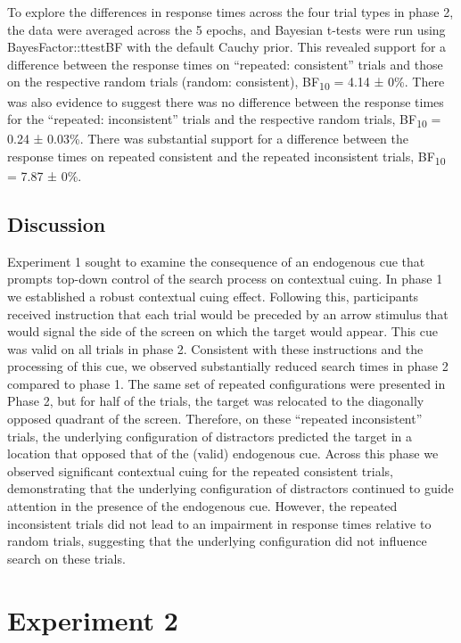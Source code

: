 \documentclass[
  man,floatsintext]{apa7}
\begin{document}
To explore the differences in response times across the four trial types in phase 2, the data were averaged across the 5 epochs, and Bayesian t-tests were run using BayesFactor::ttestBF with the default Cauchy prior. This revealed support for a difference between the response times on ``repeated: consistent'' trials and those on the respective random trials (random: consistent), BF\textsubscript{10} = 4.14 ± 0\%. There was also evidence to suggest there was no difference between the response times for the ``repeated: inconsistent'' trials and the respective random trials, BF\textsubscript{10} = 0.24 ± 0.03\%. There was substantial support for a difference between the response times on repeated consistent and the repeated inconsistent trials, BF\textsubscript{10} = 7.87 ± 0\%.

\hypertarget{discussion}{%
\subsection{Discussion}\label{discussion}}

Experiment 1 sought to examine the consequence of an endogenous cue that prompts top-down control of the search process on contextual cuing. In phase 1 we established a robust contextual cuing effect. Following this, participants received instruction that each trial would be preceded by an arrow stimulus that would signal the side of the screen on which the target would appear. This cue was valid on all trials in phase 2. Consistent with these instructions and the processing of this cue, we observed substantially reduced search times in phase 2 compared to phase 1. The same set of repeated configurations were presented in Phase 2, but for half of the trials, the target was relocated to the diagonally opposed quadrant of the screen. Therefore, on these ``repeated inconsistent'' trials, the underlying configuration of distractors predicted the target in a location that opposed that of the (valid) endogenous cue. Across this phase we observed significant contextual cuing for the repeated consistent trials, demonstrating that the underlying configuration of distractors continued to guide attention in the presence of the endogenous cue. However, the repeated inconsistent trials did not lead to an impairment in response times relative to random trials, suggesting that the underlying configuration did not influence search on these trials.

\hypertarget{experiment-2}{%
\section{Experiment 2}\label{experiment-2}}
\end{document}
